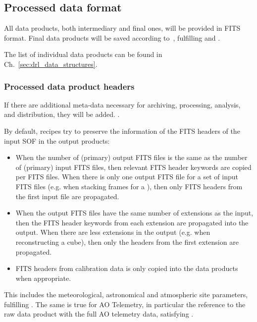 %



\subsection{Processed data format}
\label{ssec:reduced_data_format}

All data products, both intermediary and final ones, will be provided in FITS format. Final data products will be saved according to~\cite{ESO-products_standard}, fulfilling  and .

The list of individual data products can be found in
Ch.~\ref{sec:drl_data_structures}.

\subsubsection{Processed data product headers}
\label{sssec:processeddataheaders}
If there are additional meta-data necessary for archiving, processing, analysis, and distribution, they will be added. .

By default, recipes try to preserve the information of the FITS headers of the input \ac{SOF} in the output products:
\begin{itemize}
\item When the number of (primary) output FITS files is the same as the number of (primary) input FITS files, then relevant FITS header keywords are copied per FITS files. When there is only one output FITS file for a set of input FITS files (e.g. when stacking frames for a ), then only FITS headers from the first input file are propagated.
\item When the output FITS files have the same number of extensions as  the input, then the FITS header keywords from each extension are propagated into the output. When there are less extensions in the output (e.g. when reconstructing a cube), then only the headers from the first extension are propagated.
\item FITS headers from calibration data is only copied into the data products when appropriate.
\end{itemize}
This includes the meteorological, astronomical and atmospheric site parameters, fulfilling .
The same is true for \ac{AO} Telemetry, in particular the reference to the raw data product with the full \ac{AO} telemetry data, satisfying .

